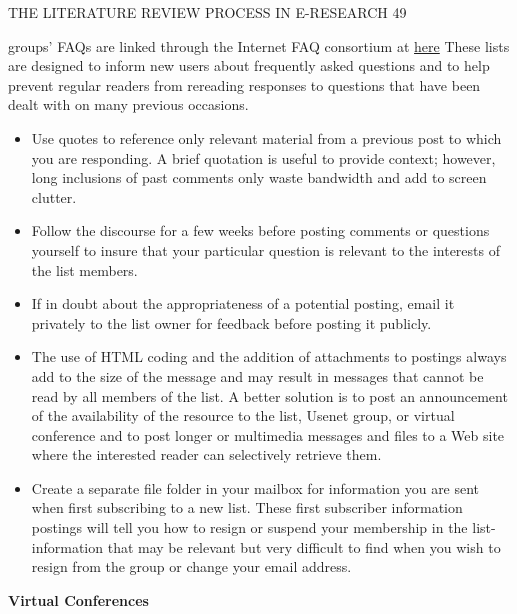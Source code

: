 \documentclass{article}
\begin{document}
\begin{flushright} 
THE LITERATURE REVIEW PROCESS IN E-RESEARCH
\hspace{6mm}
49
\end{flushright} 
\vspace{5mm}

groups' FAQs are linked through the Internet FAQ consortium at
\href{http://www.faqs.org/}{here}
These lists are designed to inform new users about frequently asked questions and to help prevent regular readers from rereading responses to questions that have been dealt with on many previous occasions.

\begin{itemize}
\item 
Use quotes to reference only relevant material from a previous post to which you are responding. A brief quotation is useful to provide context; however, long inclusions of past comments only waste bandwidth and add to screen clutter.
\item 
Follow the discourse for a few weeks before posting comments or questions
yourself to insure that your particular question is relevant to the interests of the
list members.
\item 
If in doubt about the appropriateness of a potential posting, email it privately to
the list owner for feedback before posting it publicly.
\item 
The use of HTML coding and the addition of attachments to postings always add to the size of the message and may result in messages that cannot be read by all members of the list. A better solution is to post an announcement of the availability of the resource to the list, Usenet group, or virtual conference and to post longer or multimedia messages and files to a Web site where the interested reader can selectively retrieve them.
\item 
Create a separate file folder in your mailbox for information you are sent when first subscribing to a new list. These first subscriber information postings will tell you how to resign or suspend your membership in the list-information that may be relevant but very difficult to find when you wish to resign from the group or change your email address.
\end{itemize}

\vspace{5mm}
\hspace{-2cm}
\textbf{Virtual Conferences}
\vspace{5mm}
\end{document}
